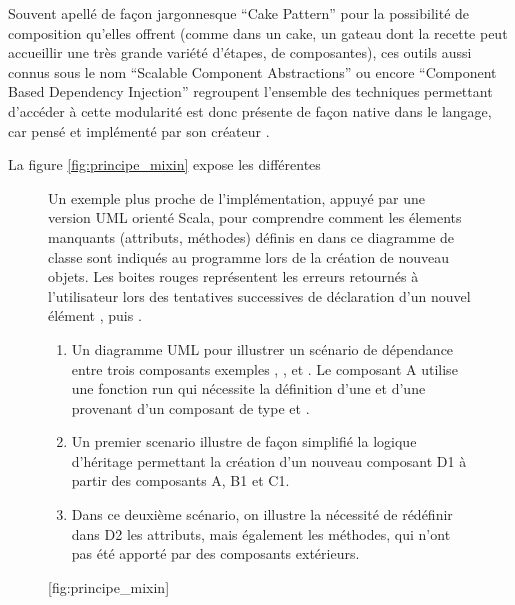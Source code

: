 
Souvent apellé de façon jargonnesque \foreignquote{english}{Cake Pattern} pour la possibilité de composition qu'elles offrent (comme dans un cake, un gateau dont la recette peut accueillir une très grande variété d'étapes, de composantes), ces outils aussi connus sous le nom \foreignquote{english}{Scalable Component Abstractions} ou encore \foreignquote{english}{Component Based Dependency Injection} regroupent  l'ensemble des techniques permettant d'accéder à cette modularité est donc présente de façon native dans le langage, car pensé et implémenté par son créateur \autocite{Oderskyxx}.


La figure \ref{fig:principe_mixin} expose les différentes 

\begin{figure}[!htbp]
	\begin{sidecaption}[fortoc]{Un exemple plus proche de l'implémentation, appuyé par une version UML orienté Scala, pour comprendre comment les élements manquants (attributs, méthodes) définis en  dans ce diagramme de classe sont indiqués au programme lors de la création de nouveau objets. Les boites rouges représentent les erreurs retournés à l'utilisateur lors des tentatives successives de déclaration d'un nouvel élément , puis . \parbox{\marginparwidth}{
\begin{enumerate}[label=(\alph*),labelindent=\parindent,leftmargin=*]
       \item Un diagramme UML pour illustrer un scénario de dépendance entre trois composants exemples , , et . Le composant A utilise une fonction run qui nécessite la définition d'une  et d'une  provenant d'un composant de type  et . 
       \item Un premier scenario illustre de façon simplifié la logique d'héritage permettant la création d'un nouveau composant D1 à partir des composants A, B1 et C1.
       \item Dans ce deuxième scénario, on illustre la nécessité de rédéfinir dans D2 les attributs, mais également les méthodes, qui n'ont pas été apporté par des composants extérieurs.
\end{enumerate}}}[fig:principe_mixin]
	\centering
	\end{sidecaption}
\end{figure}

